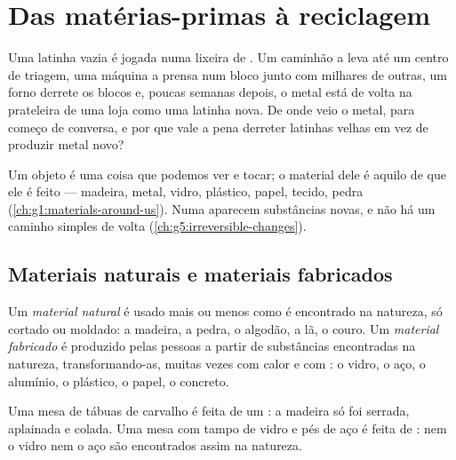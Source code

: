 \chapter{Das matérias-primas à reciclagem}\label{ch:g5:raw-materials-and-recycling}

Uma latinha vazia é jogada numa lixeira de . Um caminhão a
leva até um centro de triagem, uma máquina a prensa num bloco junto com
milhares de outras, um forno derrete os blocos e, poucas semanas depois,
o metal está de volta na prateleira de uma loja como uma latinha nova.
De onde veio o metal, para começo de conversa, e por que vale a pena
derreter latinhas velhas em vez de produzir metal novo?

\begin{recall}
Um objeto é uma coisa que podemos ver e tocar; o material dele é aquilo
de que ele é feito --- madeira, metal, vidro, plástico, papel, tecido,
pedra (\cref{ch:g1:materials-around-us}). Numa 
aparecem substâncias novas, e não há um caminho simples de volta
(\cref{ch:g5:irreversible-changes}).
\end{recall}

\section{Materiais naturais e materiais fabricados}

\begin{definition}\label{def:g5:raw-materials-and-recycling:natural-material}
Um \emph{material natural} é usado mais ou menos
como é encontrado na natureza, só cortado ou moldado: a madeira, a
pedra, o algodão, a lã, o couro. Um \emph{material
fabricado} é produzido pelas pessoas a partir
de substâncias encontradas na natureza, transformando-as, muitas vezes
com calor e com : o vidro, o aço, o alumínio, o
plástico, o papel, o concreto.
\end{definition}

\begin{example}\label{ex:g5:raw-materials-and-recycling:tables}
Uma mesa de tábuas de carvalho é feita de um : a
madeira só foi serrada, aplainada e colada. Uma mesa com tampo de vidro e
pés de aço é feita de : nem o vidro nem o aço são
encontrados assim na natureza.
\end{example}

